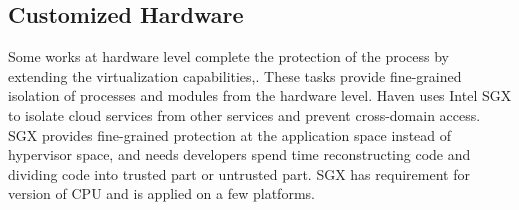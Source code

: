 \documentclass[conference]{IEEEtran}
\begin{document}

\subsection{Customized Hardware }
Some works at hardware level complete the protection of the process by extending the virtualization capabilities\cite{Moon2012Vigilare},\cite{Lee2013KI}. These tasks provide fine-grained isolation of processes and modules from the hardware level. Haven \cite{haven} uses Intel SGX\cite{Hoekstra13cuvillo,Mckeen2013Innovative} to isolate cloud services from other services and prevent cross-domain access. SGX provides fine-grained protection at the application space instead of hypervisor space, and needs developers spend time reconstructing code and dividing code into trusted part or untrusted part. SGX has requirement for version of CPU and is applied on a few platforms.%
\end{document}
